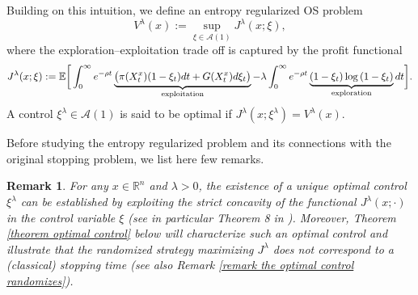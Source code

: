 \documentclass[11pt]{amsart}
\newtheorem{remark}[theorem]{Remark}
\theoremstyle{plain}
\def \dd{{\rm d}}
\def \R{\mathbb{R}}
\numberwithin{equation}{section}
\begin{document}
Building on this intuition,  we define an entropy regularized OS problem 
\begin{equation}\label{eq value singular control problem}
    V^\lambda (x) := \sup _{\xi \in \mathcal A (1)} J^\lambda ( x; \xi ), 
\end{equation}
where the exploration--exploitation trade off is captured by the profit functional 
\begin{equation*}
    J^\lambda ( x; \xi ):= \mathbb E \bigg[ \int _0^\infty e ^{-\rho t} \underbrace{\big( \pi (X^x_t) (1-\xi_t) \dd t  + G(X^x_t) \dd\xi_t \big)}_{\text{exploitation}} -\lambda \int_{0}^{\infty} e^{- \rho t} \underbrace {\left(1-\xi_{t}\right) \log \left( 1-\xi_{t} \right)}_{\text{exploration}} \dd t \bigg].
\end{equation*}
A control $\xi^\lambda \in \mathcal A (1)$ is said to be optimal if $J^\lambda (x;\xi^\lambda ) = V^\lambda (x)$.

Before studying the entropy regularized problem and its connections with the original stopping problem, we list here few remarks. 
\begin{remark}\label{remark existence of optimal control} 
For any $x \in \R^n$ and $\lambda >0$, the existence of a unique optimal control $\xi^\lambda$ can be established by exploiting the strict concavity of the functional $J^\lambda(x; \cdot)$ {in the control variable $\xi$} (see in particular Theorem 8 in \cite{Menaldi.Taksar89}).  
Moreover, Theorem \ref{theorem optimal control} below will characterize such an optimal control and illustrate that the randomized strategy maximizing $J^\lambda$ does not correspond to a (classical) stopping time (see also Remark \ref{remark the optimal control randomizes}). 
\end{remark}
\end{document}
